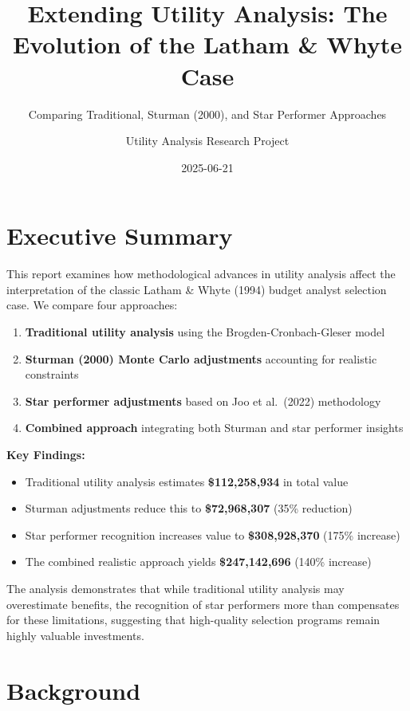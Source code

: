 \documentclass[
]{article}
\title{Extending Utility Analysis: The Evolution of the Latham \& Whyte
Case}
\subtitle{Comparing Traditional, Sturman (2000), and Star Performer
Approaches}
\author{Utility Analysis Research Project}
\date{2025-06-21}
\providecommand{\tightlist}{%
  \setlength{\itemsep}{0pt}\setlength{\parskip}{0pt}}
\begin{document}
\maketitle

{
\setcounter{tocdepth}{3}
\tableofcontents
}
\section{Executive Summary}\label{executive-summary}

This report examines how methodological advances in utility analysis
affect the interpretation of the classic Latham \& Whyte (1994) budget
analyst selection case. We compare four approaches:

\begin{enumerate}
\def\labelenumi{\arabic{enumi}.}
\tightlist
\item
  \textbf{Traditional utility analysis} using the
  Brogden-Cronbach-Gleser model
\item
  \textbf{Sturman (2000) Monte Carlo adjustments} accounting for
  realistic constraints
\item
  \textbf{Star performer adjustments} based on Joo et al.~(2022)
  methodology
\item
  \textbf{Combined approach} integrating both Sturman and star performer
  insights
\end{enumerate}

\textbf{Key Findings:}

\begin{itemize}
\tightlist
\item
  Traditional utility analysis estimates \textbf{\$112,258,934} in total
  value
\item
  Sturman adjustments reduce this to \textbf{\$72,968,307} (35\%
  reduction)
\item
  Star performer recognition increases value to \textbf{\$308,928,370}
  (175\% increase)
\item
  The combined realistic approach yields \textbf{\$247,142,696} (140\%
  increase)
\end{itemize}

The analysis demonstrates that while traditional utility analysis may
overestimate benefits, the recognition of star performers more than
compensates for these limitations, suggesting that high-quality
selection programs remain highly valuable investments.

\section{Background}\label{background}
\end{document}
